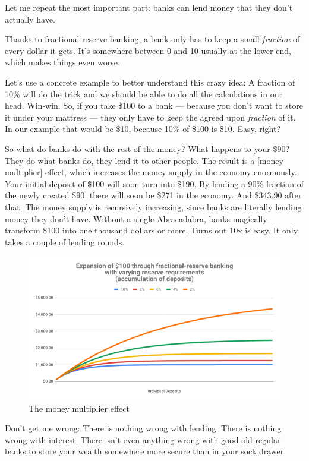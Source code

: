 Let me repeat the most important part: banks can lend money that they
don't actually have.

Thanks to fractional reserve banking, a bank only has to keep a small
\textit{fraction} of every dollar it gets. It's somewhere between 0 and 10%
usually at the lower end, which makes things even worse.

Let's use a concrete example to better understand this crazy idea: A
fraction of 10\% will do the trick and we should be able to do all the
calculations in our head. Win-win. So, if you take \$100 to a
bank --- because you don't want to store it under your mattress --- they
only have to keep the agreed upon \textit{fraction} of it. In our example that
would be \$10, because 10\% of \$100 is \$10. Easy, right?

So what do banks do with the rest of the money? What happens to your
\$90? They do what banks do, they lend it to other people. The result is
a [money multiplier] effect, which increases the money supply in the
economy enormously. Your initial deposit of \$100 will soon turn into
\$190. By lending a 90\% fraction of the newly created \$90, there will
soon be \$271 in the economy. And \$343.90 after that. The money supply
is recursively increasing, since banks are literally lending money they
don't have. Without a single Abracadabra, banks magically transform
\$100 into one thousand dollars or more. Turns out 10x is easy. It only
takes a couple of lending rounds.

\begin{figure}
  \centering
  \includegraphics{assets/images/money-multiplier.png}
  \caption{The money multiplier effect}
  \label{fig:money-multiplier}
\end{figure}

Don't get me wrong: There is nothing wrong with lending. There is
nothing wrong with interest. There isn't even anything wrong with good
old regular banks to store your wealth somewhere more secure than in
your sock drawer.

